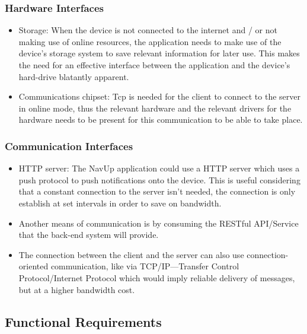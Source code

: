 \documentclass[runningheads,a4paper]{article}
\begin{document}
\subsubsection{Hardware Interfaces}
\begin{itemize}
	
	\item Storage: When the device is not connected to the internet and / or not making use of online resources, the application needs to make use of the device's storage system to save relevant information for later use. This makes the need for an effective interface between the application and the device's hard-drive blatantly apparent.
	
	\item Communications chipset: Tcp is needed for the client to connect to the server in online mode, thus the relevant hardware and the relevant drivers for the hardware needs to be present for this communication to be able to take place.
	
\end{itemize}

\subsubsection{Communication Interfaces}
\begin{itemize}

	\item HTTP server: The NavUp application could use a HTTP server which uses a push protocol to push notifications onto the device. This is useful considering that a constant connection to the server isn't needed, the connection is only establish at set intervals in order to save on bandwidth.
	
	\item  Another means of communication is by consuming the RESTful API/Service that the back-end system will provide.
	
	\item The connection between the client and the server can also use connection-oriented communication, like via TCP/IP—Transfer Control Protocol/Internet Protocol which would imply reliable delivery of messages, but at a higher bandwidth cost.

\end{itemize}

\subsection{Functional Requirements}
\end{document}
